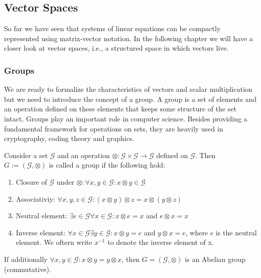 \subsection{Vector Spaces}
So far we have seen that systems of linear equations can be compactly represented using matrix-vector notation. In the following chapter we will have a closer look at vector spaces, i.e., a structured space in which vectors live.
\subsubsection{Groups}
We are ready to formalize the characteristics of vectors and scalar multiplication but we need to introduce the concept of a group. A group is a set of elements and an operation defined on these elements that keeps some structure of the set intact.
Groups play an important role in computer science. Besides providing a fundamental framework for operations on sets, they are heavily used in cryptography, coding theory and graphics.
\begin{definition}[Group]
    Consider a set $\mathcal{G}$ and an operation $\otimes: \mathcal{G} \times \mathcal{G} \rightarrow \mathcal{G}$ defined on $\mathcal{G}$. Then $G:=(\mathcal{G},\otimes)$ is called a group if the following hold:
    \begin{enumerate}
        \item Closure of $\mathcal{G}$ under $\otimes: \forall x,y \in \mathcal{G}: x\otimes y \in \mathcal{G}$
        \item Associativiy: $\forall x,y,z \in \mathcal{G}: (x\otimes y) \otimes z = x \otimes(y \otimes z)$
        \item Neutral element: $\exists e \in \mathcal{ G} \forall x \in \mathcal{G} : x\otimes e = x$ and $e \otimes x =x$
        \item Inverse element: $\forall x \in \mathcal{G} \exists y\in \mathcal{G}: x\otimes y = e$ and $y\otimes x = e$, where $e$ is the neutral element. We oftern write $x^{-1}$ to denote the inverse element of x.
    \end{enumerate}
\end{definition}
\begin{remark}
    If additionally $\forall x,y \in \mathcal{G}: x\otimes y = y\otimes x$, then $G = (\mathcal{G,\otimes})$ is an Abelian group (commutative).
\end{remark}
